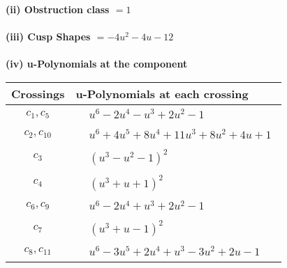 \documentclass[1p]{elsarticle_modified}
\theoremstyle{definition}
\begin{document}
\flushleft \textbf{(ii) Obstruction class $= 1$}\\~\\
\flushleft \textbf{(iii) Cusp Shapes $= -4 u^2-4 u-12$}\\~\\
\newpage\renewcommand{\arraystretch}{1}
\flushleft \textbf{(iv) u-Polynomials at the component}\newline \\
\begin{tabular}{m{50pt}|m{274pt}}
Crossings & \hspace{64pt}u-Polynomials at each crossing \\
\hline $$\begin{aligned}c_{1},c_{5}\end{aligned}$$&$\begin{aligned}
&u^6-2 u^4- u^3+2 u^2-1
\end{aligned}$\\
\hline $$\begin{aligned}c_{2},c_{10}\end{aligned}$$&$\begin{aligned}
&u^6+4 u^5+8 u^4+11 u^3+8 u^2+4 u+1
\end{aligned}$\\
\hline $$\begin{aligned}c_{3}\end{aligned}$$&$\begin{aligned}
&(u^3- u^2-1)^2
\end{aligned}$\\
\hline $$\begin{aligned}c_{4}\end{aligned}$$&$\begin{aligned}
&(u^3+u+1)^2
\end{aligned}$\\
\hline $$\begin{aligned}c_{6},c_{9}\end{aligned}$$&$\begin{aligned}
&u^6-2 u^4+u^3+2 u^2-1
\end{aligned}$\\
\hline $$\begin{aligned}c_{7}\end{aligned}$$&$\begin{aligned}
&(u^3+u-1)^2
\end{aligned}$\\
\hline $$\begin{aligned}c_{8},c_{11}\end{aligned}$$&$\begin{aligned}
&u^6-3 u^5+2 u^4+u^3-3 u^2+2 u-1
\end{aligned}$\\
\hline
\end{tabular}\\~\\
\end{document}
